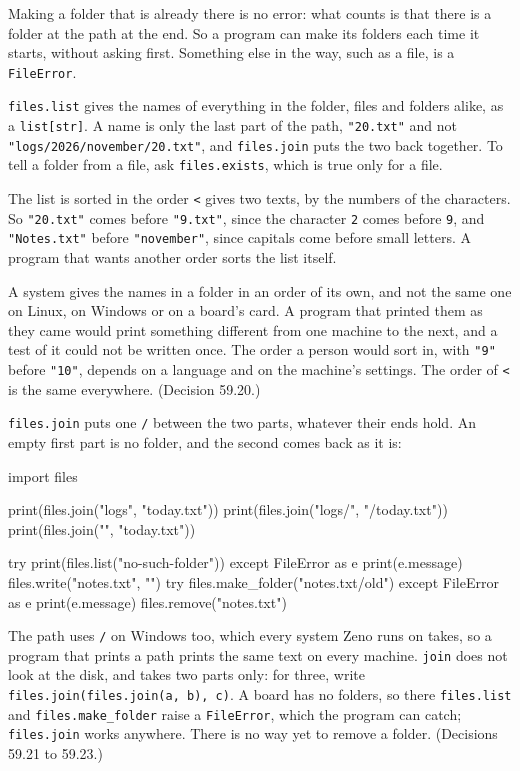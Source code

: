 Making a folder that is already there is no error: what counts is
that there is a folder at the path at the end. So a program can make
its folders each time it starts, without asking first. Something else
in the way, such as a file, is a \verb|FileError|.

\verb|files.list| gives the names of everything in the folder, files
and folders alike, as a \verb|list[str]|. A name is only the last
part of the path, \verb|"20.txt"| and not
\verb|"logs/2026/november/20.txt"|, and \verb|files.join| puts the
two back together. To tell a folder from a file, ask
\verb|files.exists|, which is true only for a file.

The list is sorted in the order \verb|<| gives two texts, by the
numbers of the characters. So \verb|"20.txt"| comes before
\verb|"9.txt"|, since the character \verb|2| comes before \verb|9|,
and \verb|"Notes.txt"| before \verb|"november"|, since capitals come
before small letters. A program that wants another order sorts the
list itself.

\begin{why}
A system gives the names in a folder in an order of its own, and not
the same one on Linux, on Windows or on a board's card. A program that
printed them as they came would print something different from one
machine to the next, and a test of it could not be written once. The
order a person would sort in, with \verb|"9"| before \verb|"10"|,
depends on a language and on the machine's settings. The order of
\verb|<| is the same everywhere. (Decision 59.20.)
\end{why}

\verb|files.join| puts one \verb|/| between the two parts, whatever
their ends hold. An empty first part is no folder, and the second
comes back as it is:

\begin{zeno}[file=paths.zeno, dir=folders]
import files

print(files.join("logs", "today.txt"))
print(files.join("logs/", "/today.txt"))
print(files.join("", "today.txt"))

try {
    print(files.list("no-such-folder"))
} except FileError as e {
    print(e.message)
}
files.write("notes.txt", "")
try {
    files.make_folder("notes.txt/old")
} except FileError as e {
    print(e.message)
}
files.remove("notes.txt")
\end{zeno}

The path uses \verb|/| on Windows too, which every system Zeno runs on
takes, so a program that prints a path prints the same text on every
machine. \verb|join| does not look at the disk, and takes two parts
only: for three, write \verb|files.join(files.join(a, b), c)|. A board
has no folders, so there \verb|files.list| and
\verb|files.make_folder| raise a \verb|FileError|, which the program
can catch; \verb|files.join| works anywhere. There is no way yet to
remove a folder. (Decisions 59.21 to 59.23.)

